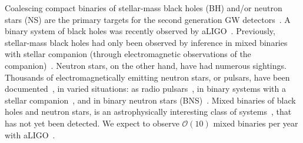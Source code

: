 \documentclass[aps,prd,amsmath,floats,floatfix, twocolumn,
superscriptaddress,nofootinbib,showpacs]{revtex4-1}
\newcommand{\red}{\textcolor{red}}
\newcommand{\prayush}{\textcolor{red!40!black}}
\begin{document}
Coalescing compact binaries of stellar-mass black holes (BH) and/or
neutron stars (NS) are the primary targets for the second
generation GW detectors~\cite{Timmes:1995kp,Fryer:1999mi,RevModPhys.74.1015,
2010ApJ...714.1217B,2010ApJ...715L.138B,Dominik:2014yma,Belczynski:2006zi,
2012ApJ...749...91F,
Wex:1998wt,1991ApJ...379L..17N,Mandel:2015spa,Abbott:2016nhf}.
A binary system of black holes was recently observed by 
aLIGO~\cite{LIGOVirgo2016a}. Previously, stellar-mass black holes had only 
been observed by inference in mixed binaries with stellar companion (through
electromagnetic observations of the companion)~\cite{Lewin2010,
Remillard:2006fc,Fragos:2010tm}.
Neutron stars, on the other hand, have had numerous sightings. Thousands of
electromagnetically emitting neutron stars, or pulsars, have been 
documented~\cite{Manchester:2004bp},
in varied situations: as radio pulsars~\cite{Lattimer:2012nd,Manchester:2004bp},
in binary systems with a stellar companion~\cite{1971ApJ...169L..23M,
Bond:2002eh,Lattimer:2012nd,Manchester:2004bp},
and in binary neutron stars (BNS)~\cite{Hulse:1975uf,Taylor:1982wi,
Weisberg:2010zz,Lattimer:2012nd,Manchester:2004bp}.
Mixed binaries of black holes and neutron stars, is an astrophysically
interesting class of systems~\cite{Wex:1998wt,
1991ApJ...379L..17N,Janka1999,Fryer:2015jpa}, that has not yet been detected.
We expect to observe $\mathcal{O}(10)$ mixed binaries per year with
aLIGO~\cite{Abadie:2010cf}.




% 
\end{document}
